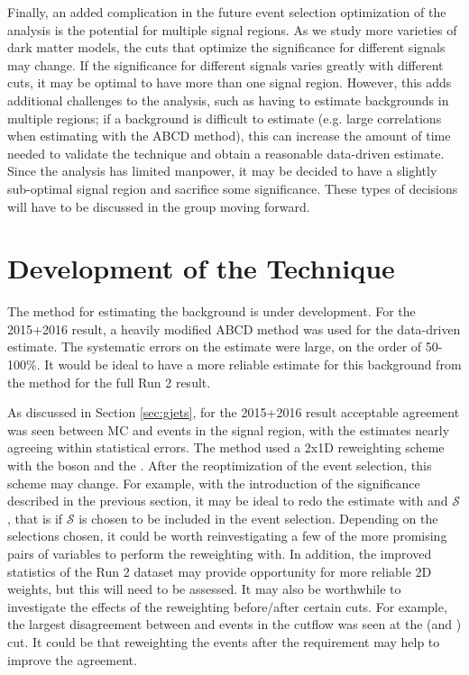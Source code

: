 Finally, an added complication in the future event selection optimization of the analysis is the potential for multiple signal regions. As we study more varieties of dark matter models, the cuts that optimize the significance for different signals may change. If the significance for different signals varies greatly with different cuts, it may be optimal to have more than one signal region. However, this adds additional challenges to the analysis, such as having to estimate backgrounds in multiple regions; if a background is difficult to estimate (e.g. large correlations when estimating \Zjets with the ABCD method), this can increase the amount of time needed to validate the technique and obtain a reasonable data-driven estimate. Since the analysis has limited manpower, it may be decided to have a slightly sub-optimal signal region and sacrifice some significance. These types of decisions will have to be discussed in the group moving forward.


\section{Development of the \gjets Technique}

The \gjets method for estimating the \Zjets background is under development. For the 2015+2016 result, a heavily modified ABCD method was used for the \Zjets data-driven estimate. The systematic errors on the estimate were large, on the order of 50-100\%. It would be ideal to have a more reliable estimate for this background from the \gjets method for the full Run 2 result.

As discussed in Section \ref{sec:gjets}, for the 2015+2016 result acceptable agreement was seen between MC \gjets and \Zjets events in the signal region, with the estimates nearly agreeing within statistical errors. The method used a 2x1D reweighting scheme with the boson \pt and the \etmissht. After the reoptimization of the event selection, this scheme may change. For example, with the introduction of the \etmiss significance described in the previous section, it may be ideal to redo the \gjets estimate with \pt and $\mathcal{S}$, that is if $\mathcal{S}$ is chosen to be included in the event selection. Depending on the selections chosen, it could be worth reinvestigating a few of the more promising pairs of variables to perform the reweighting with. In addition, the improved statistics of the Run 2 dataset may provide opportunity for more reliable 2D weights, but this will need to be assessed. It may also be worthwhile to investigate the effects of the reweighting before/after certain cuts. For example, the largest disagreement between \gjets and \Zjets events in the cutflow was seen at the \etmiss (and \etmissht) cut. It could be that reweighting the events after the \etmiss requirement may help to improve the agreement.

